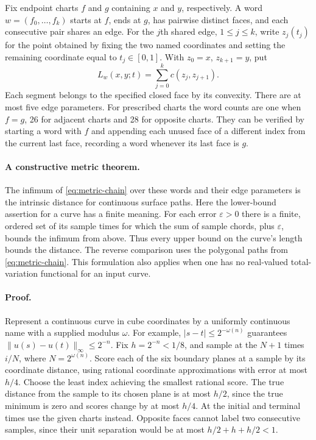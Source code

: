 \documentclass[10pt,letterpaper]{article}
\begin{document}
Fix endpoint charts $f$ and $g$ containing $x$ and $y$, respectively.
A word $w=(f_0,\ldots,f_k)$ starts at $f$, ends at $g$, has pairwise
distinct faces, and each consecutive pair shares an edge. For the $j$th
shared edge, $1\le j\le k$, write $z_j(t_j)$ for the point obtained by
fixing the two named coordinates and setting the remaining coordinate
equal to $t_j\in[0,1]$. With $z_0=x$, $z_{k+1}=y$, put
\begin{equation}
  L_w(x,y;t)=\sum_{j=0}^k c(z_j,z_{j+1}).
  \label{eq:metric-chain}
\end{equation}
Each segment belongs to the specified closed face by its convexity.
There are at most five edge parameters. For prescribed charts the word
counts are one when $f=g$, 26 for adjacent charts and 28 for opposite
charts. They can be verified by starting a word with $f$ and appending
each unused face of a different index from the current last face,
recording a word whenever its last face is $g$.

\paragraph{A constructive metric theorem.}
The infimum of \eqref{eq:metric-chain} over these words and their edge
parameters is the intrinsic distance for continuous surface paths.
Here the lower-bound assertion for a curve has a finite meaning. For
each error $\varepsilon>0$ there is a finite, ordered set of its
sample times for which the sum of sample chords, plus $\varepsilon$,
bounds the infimum from above. Thus every upper bound on the curve's
length bounds the distance. The reverse comparison uses the polygonal
paths from \eqref{eq:metric-chain}. This formulation also applies when
one has no real-valued total-variation functional for an input curve.

\paragraph{Proof.}
Represent a continuous curve in cube coordinates by a uniformly
continuous name with a supplied modulus $\omega$. For example,
$|s-t|\le2^{-\omega(n)}$ guarantees
$\|u(s)-u(t)\|_\infty\le2^{-n}$. Fix $h=2^{-n}<1/8$, and sample at
the $N+1$ times $i/N$, where $N=2^{\omega(n)}$. Score each of the six
boundary planes at a sample by its coordinate distance, using rational
coordinate approximations with error at most $h/4$. Choose the least
index achieving the smallest rational score. The true distance from the
sample to its chosen plane is at most $h/2$, since the true minimum is
zero and scores change by at most $h/4$. At the initial and terminal
times use the given charts instead. Opposite faces cannot label two
consecutive samples, since their unit separation would be at most
$h/2+h+h/2<1$.
\end{document}
